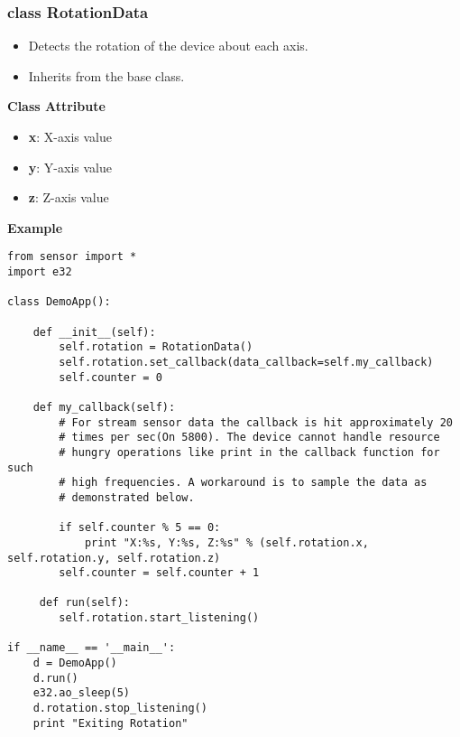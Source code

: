 \subsubsection{class RotationData}

\begin{itemize}
\item Detects the rotation of the device about each axis.
\item Inherits from the  base class.
\end{itemize}

{\bf Class Attribute} \break

\begin{itemize}
\item {\bf x}: X-axis value
\item {\bf y}: Y-axis value
\item {\bf z}: Z-axis value
\end{itemize}

{\bf Example} \break

\begin{verbatim}
from sensor import *
import e32

class DemoApp():

    def __init__(self):
        self.rotation = RotationData()
        self.rotation.set_callback(data_callback=self.my_callback)
        self.counter = 0

    def my_callback(self):
        # For stream sensor data the callback is hit approximately 20
        # times per sec(On 5800). The device cannot handle resource
        # hungry operations like print in the callback function for such
        # high frequencies. A workaround is to sample the data as
        # demonstrated below.

        if self.counter % 5 == 0:
            print "X:%s, Y:%s, Z:%s" % (self.rotation.x, self.rotation.y, self.rotation.z)
        self.counter = self.counter + 1

     def run(self):
        self.rotation.start_listening()

if __name__ == '__main__':
    d = DemoApp()
    d.run()
    e32.ao_sleep(5)
    d.rotation.stop_listening()
    print "Exiting Rotation"
\end{verbatim}


























 




			

 


